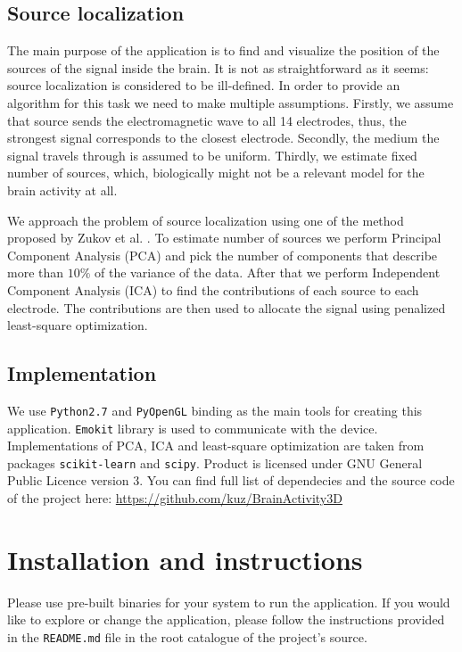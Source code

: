 \documentclass[twocolumn]{article}
\begin{document}
\subsection*{Source localization}
The main purpose of the application is to find and visualize the position of the sources of the signal inside the brain. It is not as straightforward as it seems: source localization is considered to be ill-defined. In order to provide an algorithm for this task we need to make multiple assumptions. Firstly, we assume that source sends the electromagnetic wave to all 14 electrodes, thus, the strongest signal corresponds to the closest electrode. Secondly, the medium the signal travels through is assumed to be uniform. Thirdly, we estimate fixed number of sources, which, biologically might not be a relevant model for the brain activity at all.

We approach the problem of source localization using one of the method proposed by Zukov et al. \cite{zhukov2000}. To estimate number of sources we perform Principal Component Analysis (PCA) and pick the number of components that describe more than $10\%$ of the variance of the data. After that we perform Independent Component Analysis (ICA) to find the contributions of each source to each electrode. The contributions are then used to allocate the signal using penalized least-square optimization.

\subsection*{Implementation}
We use \texttt{Python2.7} and \texttt{PyOpenGL} binding as the main tools for creating this application. \texttt{Emokit} library is used to communicate with the device. Implementations of PCA, ICA and least-square optimization are taken from packages \texttt{scikit-learn}\cite{scikit-learn} and \texttt{scipy}\cite{scipy}. Product is licensed under GNU General Public Licence version 3. You can find full list of dependecies and the source code of the project here: \url{https://github.com/kuz/BrainActivity3D}

%
%
\section*{Installation and instructions}
Please use pre-built binaries for your system to run the application. If you would like to explore or change the application, please follow the instructions provided in the \texttt{README.md} file in the root catalogue of the project's source.
\end{document}
